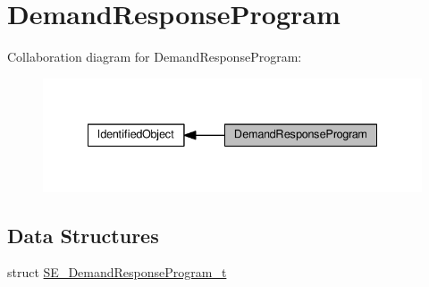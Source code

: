 \hypertarget{group__DemandResponseProgram}{}\section{Demand\+Response\+Program}
\label{group__DemandResponseProgram}
Collaboration diagram for Demand\+Response\+Program\+:\nopagebreak
\begin{figure}[H]
\begin{center}
\leavevmode
\includegraphics[width=335pt]{group__DemandResponseProgram}
\end{center}
\end{figure}
\subsection*{Data Structures}
\begin{DoxyCompactItemize}
\item 
struct \hyperlink{structSE__DemandResponseProgram__t}{S\+E\+\_\+\+Demand\+Response\+Program\+\_\+t}
\end{DoxyCompactItemize}

